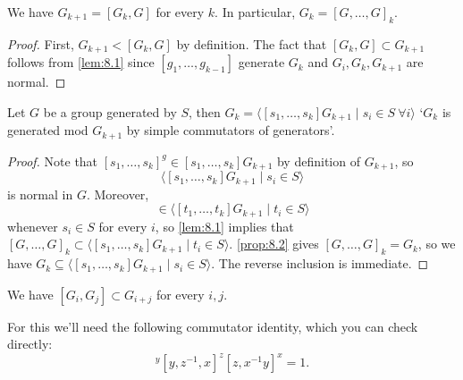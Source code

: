 \documentclass{article}
\numberwithin{equation}{section}
\begin{document}
\begin{nprop}\label{prop:8.2}
  We have $G_{k+1} = [G_k,G]$ for every $k$. In particular, $G_k = [G, \dotsc, G]_k$.
\end{nprop}
\begin{proof}
  First, $G_{k+1}  < [G_k,G]$ by definition.
  The fact that $[G_k,G] \subset G_{k+1}$ follows from \cref{lem:8.1} since $[g_1, \dotsc, g_{k-1}]$ generate $G_k$ and $G_i, G_k, G_{k+1}$ are normal.
\end{proof}
\begin{nprop}\label{prop:8.3}
  Let $G$ be a group generated by $S$, then $G_k = \langle [s_1, \dotsc, s_k] G_{k+1} \mid s_i \in S \ \forall i\rangle$
  `$G_k$ is generated mod $G_{k+1}$ by simple commutators of generators'.
\end{nprop}
\begin{proof}
  Note that $[s_1, \dotsc, s_k]^g \in [s_1, \dotsc, s_k] G_{k+1}$ by definition of $G_{k+1}$, so
  \begin{equation*}
  \langle[s_1, \dotsc, s_k] G_{k+1} \mid s_i \in S\rangle
  \end{equation*}
  is normal in $G$.
  Moreover,
  \begin{equation*}
  [s_1, \dotsc, s_k] \in \langle [t_1, \dotsc, t_k] G_{k+1} \mid t_i \in S\rangle
  \end{equation*}
  whenever $s_i \in S$ for every $i$, so \cref{lem:8.1} implies that
  $[G, \dotsc, G]_k \subset \langle [s_1, \dotsc, s_k] G_{k+1} \mid t_i \in S \rangle$.
  \cref{prop:8.2} gives $[G, \dotsc, G]_k = G_k$, so we have $G_k \subseteq \langle [s_1, \dotsc, s_k] G_{k+1} \mid s_i \in S \rangle$.
  The reverse inclusion is immediate.
\end{proof}
\begin{nprop}\label{prop:8.4}
  We have $[G_i, G_j] \subset G_{i+j}$ for every $i,j$.
\end{nprop}
For this we'll need the following commutator identity, which you can check directly:
\begin{equation}
  [x, y^{-1}, z]^y [y,z^{-1},x]^z [z,x^{-1} y]^x = 1. \label{eq:8.2}
\end{equation}
\end{document}
